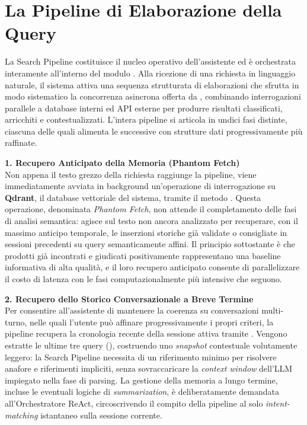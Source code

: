 \section{La Pipeline di Elaborazione della Query}

La Search Pipeline costituisce il nucleo operativo dell'assistente ed è
orchestrata interamente all'interno del modulo .
Alla ricezione di una richiesta in linguaggio naturale, il sistema attiva
una sequenza strutturata di elaborazioni che sfrutta in modo sistematico
la concorrenza asincrona offerta da , combinando interrogazioni
parallele a database interni ed API esterne per produrre risultati
classificati, arricchiti e contestualizzati. L'intera pipeline si articola
in undici fasi distinte, ciascuna delle quali alimenta le successive con
strutture dati progressivamente più raffinate.

\vspace{0.4cm}
\noindent
\textbf{1. Recupero Anticipato della Memoria (Phantom Fetch)}\\
Non appena il testo grezzo della richiesta raggiunge la pipeline, viene
immediatamente avviata in background un'operazione di interrogazione su
\textbf{Qdrant}, il database vettoriale del sistema, tramite il metodo
. Questa operazione, denominata \emph{Phantom Fetch},
non attende il completamento delle fasi di analisi semantica: agisce sul
testo non ancora analizzato per recuperare, con il massimo anticipo
temporale, le inserzioni storiche già validate o consigliate in sessioni
precedenti su query semanticamente affini. Il principio sottostante è che
prodotti già incontrati e giudicati positivamente rappresentano una
baseline informativa di alta qualità, e il loro recupero anticipato
consente di parallelizzare il costo di latenza con le fasi computazionalmente
più intensive che seguono.

\vspace{0.4cm}
\noindent
\textbf{2. Recupero dello Storico Conversazionale a Breve Termine}\\
Per consentire all'assistente di mantenere la coerenza su conversazioni
multi-turno, nelle quali l'utente può affinare progressivamente i propri
criteri, la pipeline recupera la cronologia recente della sessione attiva tramite .
Vengono estratte le ultime tre query (), costruendo uno
\textit{snapshot} contestuale volutamente leggero: la Search Pipeline
necessita di un riferimento minimo per risolvere anafore e riferimenti
impliciti, senza sovraccaricare la \textit{context window} dell'LLM
impiegato nella fase di parsing. La gestione della memoria a lungo
termine, incluse le eventuali logiche di \textit{summarization},
è deliberatamente demandata all'Orchestratore ReAct, circoscrivendo
il compito della pipeline al solo \textit{intent-matching} istantaneo
sulla sessione corrente.

